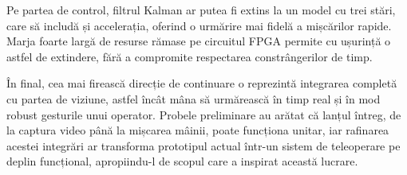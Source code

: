 Pe partea de control, filtrul Kalman ar putea fi extins la un model cu trei stări, care
să includă și accelerația, oferind o urmărire mai fidelă a mișcărilor rapide. Marja
foarte largă de resurse rămase pe circuitul FPGA permite cu ușurință o astfel de
extindere, fără a compromite respectarea constrângerilor de timp.

În final, cea mai firească direcție de continuare o reprezintă integrarea completă cu
partea de viziune, astfel încât mâna să urmărească în timp real și în mod robust
gesturile unui operator. Probele preliminare au arătat că lanțul întreg, de la captura
video până la mișcarea mâinii, poate funcționa unitar, iar rafinarea acestei integrări ar
transforma prototipul actual într-un sistem de teleoperare pe deplin funcțional,
apropiindu-l de scopul care a inspirat această lucrare.
